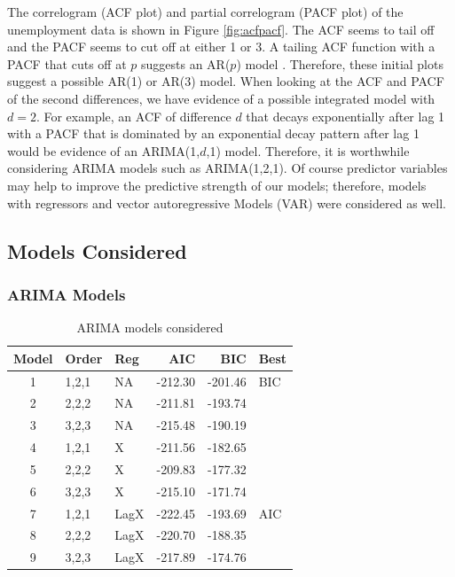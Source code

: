\documentclass[twoside,twocolumn]{article}
\begin{document}
  The correlogram (ACF plot) and partial correlogram (PACF plot) of the unemployment data is shown in Figure \ref{fig:acfpacf}. The ACF seems to tail off and the PACF seems to cut off at either 1 or 3.  A tailing ACF function with a PACF that cuts off at \(p\) suggests an AR(\(p\)) model \citep{Box2008}. Therefore, these initial plots suggest a possible AR(1) or AR(3) model. When looking at the ACF and PACF of the second differences, we have evidence of a possible integrated model with \(d=2\). For example, an ACF of difference \(d\) that decays exponentially after lag 1 with a PACF that is dominated by an exponential decay pattern after lag 1 would be evidence of an ARIMA(1,\(d\),1) model. Therefore, it is worthwhile considering ARIMA models such as ARIMA(1,2,1). Of course predictor variables may help to improve the predictive strength of our models; therefore, models with regressors and vector autoregressive Models (VAR) were considered as well.
\subsection{Models Considered}

\subsubsection{ARIMA Models}
\begin{table}[htb]
\centering
\caption{ARIMA models considered}
\label{tab:arimachoices}
\begin{tabular}{cllrrl}
  \hline
 Model & Order & Reg  & AIC & BIC & Best \\
  \hline
1 & 1,2,1 &  NA &   -212.30 & -201.46 & BIC \\
  2  & 2,2,2 & NA   & -211.81 & -193.74 &  \\
  3  & 3,2,3 &  NA  & -215.48 & -190.19 &  \\
  4  & 1,2,1 & X  & -211.56 & -182.65 &  \\
  5  & 2,2,2 & X   & -209.83 & -177.32 &  \\
  6  & 3,2,3 & X   & -215.10 & -171.74 &  \\
  7  & 1,2,1 &  LagX & -222.45 & -193.69 & AIC \\
  8  & 2,2,2 &  LagX & -220.70 & -188.35 &  \\
  9  & 3,2,3 &  LagX & -217.89 & -174.76 &  \\
   \hline
\end{tabular}
\end{table}
\end{document}
